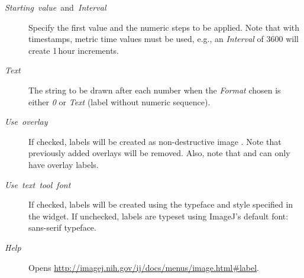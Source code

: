 \begin{description}
\item [{\emph{Starting\ value\ }and\emph{\ Interval}}] Specify the first
value and the numeric steps to be applied. Note that with timestamps,
metric time values must be used, e.g., an \emph{Interval} of 3600
will create 1\,hour increments.
\item [{\emph{Text}}] The string to be drawn after each number when the
\emph{Format} chosen is either \emph{0} or \emph{Text} (label without
numeric sequence).
\item [{\emph{Use\ overlay}}] If checked, labels will be created as non-destructive
image . Note that previously added overlays
will be removed. Also, note that  and
 can only have overlay labels.
\item [{\emph{Use\ text\ tool\ font}}] If checked, labels will be created
using the typeface and style specified in the 
widget. If unchecked, labels are typeset using ImageJ's default font:
sans-serif typeface.
\item [{\emph{Help}}] Opens \href{http://imagej.nih.gov/ij/docs/menus/image.html\#label}{http://imagej.nih.gov/ij/docs/menus/image.html\#{}label}.
\end{description}



\subsubsection{\protect{}\label{sub:Stack>Tools}}


\paragraph{\protect{}\label{sub:Combine...}}

